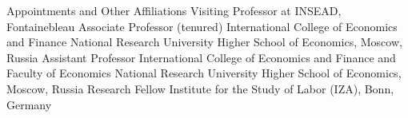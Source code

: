 

\begin{rubric}{Appointments and Other Affiliations}
\entry*[Spring 2016] Visiting Professor at INSEAD, Fontainebleau
\entry*[2015--]  Associate Professor (tenured) \newline
                  International College of Economics and Finance \newline
                  National Research University Higher School of Economics, Moscow, Russia
\entry*[2009--2015]  Assistant Professor \newline
                  International College of Economics and Finance and Faculty of Economics \newline
                  National Research University Higher School of Economics, Moscow, Russia
\entry*[2013--]  Research Fellow \newline
                  Institute for the Study of Labor (IZA), Bonn, Germany

\end{rubric}
